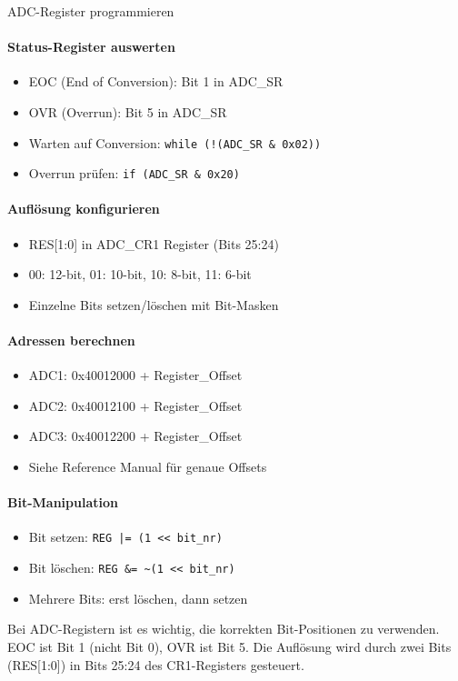\begin{KR}{ADC-Register programmieren}
    \paragraph{Status-Register auswerten}
    \begin{itemize}
        \item EOC (End of Conversion): Bit 1 in ADC\_SR
        \item OVR (Overrun): Bit 5 in ADC\_SR
        \item Warten auf Conversion: \texttt{while (!(ADC\_SR \& 0x02))}
        \item Overrun prüfen: \texttt{if (ADC\_SR \& 0x20)}
    \end{itemize}
    
    \paragraph{Auflösung konfigurieren}
    \begin{itemize}
        \item RES[1:0] in ADC\_CR1 Register (Bits 25:24)
        \item 00: 12-bit, 01: 10-bit, 10: 8-bit, 11: 6-bit
        \item Einzelne Bits setzen/löschen mit Bit-Masken
    \end{itemize}
    
    \paragraph{Adressen berechnen}
    \begin{itemize}
        \item ADC1: 0x40012000 + Register\_Offset
        \item ADC2: 0x40012100 + Register\_Offset  
        \item ADC3: 0x40012200 + Register\_Offset
        \item Siehe Reference Manual für genaue Offsets
    \end{itemize}
    
    \paragraph{Bit-Manipulation}
    \begin{itemize}
        \item Bit setzen: \texttt{REG |= (1 << bit\_nr)}
        \item Bit löschen: \texttt{REG \&= \~{}(1 << bit\_nr)}
        \item Mehrere Bits: erst löschen, dann setzen
    \end{itemize}
\end{KR}
\begin{remark}
    Bei ADC-Registern ist es wichtig, die korrekten Bit-Positionen zu verwenden. EOC ist Bit 1 (nicht Bit 0), OVR ist Bit 5. Die Auflösung wird durch zwei Bits (RES[1:0]) in Bits 25:24 des CR1-Registers gesteuert.
\end{remark}


